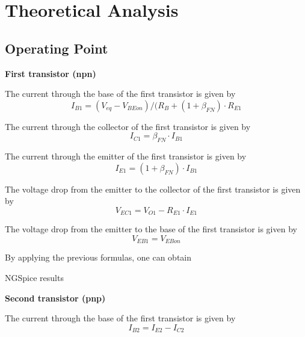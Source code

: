 \section{Theoretical Analysis}
\label{sec:theoretical analysis}

\subsection{Operating Point}

\indent

\textbf{First transistor (npn)} 

\indent

The current through the base of the first transistor is given by $$I_{B1}=(V_{eq}-V_{BEon})/(R_B+(1+\beta_{FN})\cdot R_{E1}$$

The current through the collector of the first transistor is given by $$I_{C1}=\beta _{FN}\cdot I_{B1}$$

The current through the emitter of the first transistor is given by $$I_{E1}=(1+\beta _{FN})\cdot I_{B1}$$

The voltage drop from the emitter to the collector of the first transistor is given by $$ V_{EC1}=V_{O1}-R_{E1}\cdot I_{E1} $$

The voltage drop from the emitter to the base of the first transistor is given by $$ V_{EB1} = V_{EBon} $$

By applying the previous formulas, one can obtain
\vspace{0.5cm}


\vspace{0.5cm}


\vspace{0.5cm}

NGSpice results

\vspace{0.5cm}


\vspace{0.5cm}

\textbf{Second transistor (pnp)}

\indent



The current through the base of the first transistor is given by $$I_{B2} = I_{E2}-I_{C2}$$

